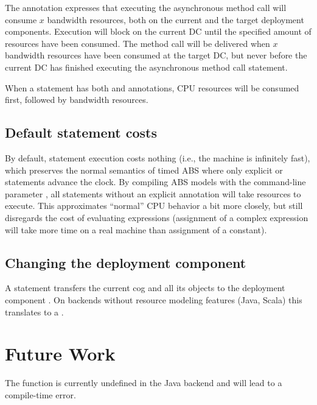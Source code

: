 The annotation  expresses that executing the
asynchronous method call  will consume $x$ bandwidth
resources, both on the current and the target deployment components.
Execution will block on the current DC until the specified amount of resources
have been consumed.  The method call will be delivered when $x$ bandwidth
resources have been consumed at the target DC, but never before the current DC
has finished executing the asynchronous method call statement.

When a statement has both  and  annotations,
CPU resources will be consumed first, followed by bandwidth resources.

\subsection{Default statement costs}

By default, statement execution costs nothing (i.e., the machine is infinitely
fast), which preserves the normal semantics of timed ABS where only explicit
 or  statements advance the
clock.  By compiling ABS models with the command-line parameter
, all statements without an explicit
\absinline{[Cost: x]} annotation will take  resources to execute.
This approximates ``normal'' CPU behavior a bit more closely, but still
disregards the cost of evaluating expressions (assignment of a complex
expression will take more time on a real machine than assignment of a
constant).

\subsection{Changing the deployment component}

A statement  transfers the current cog and all its
objects to the deployment component .  On backends without
resource modeling features (Java, Scala) this translates to a
.

\section{Future Work}

The  function is currently undefined in the Java
backend and will lead to a compile-time error.


